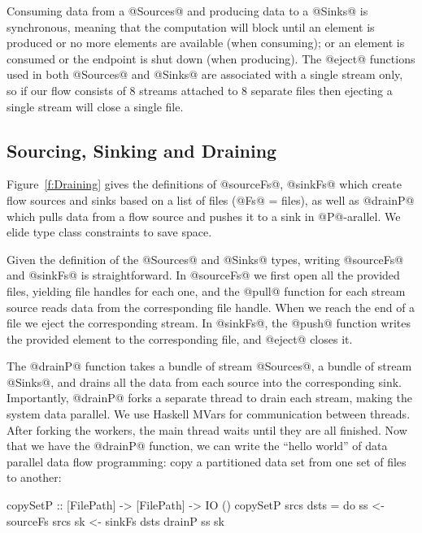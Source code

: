 Consuming data from a @Sources@ and producing data to a @Sinks@ is synchronous, meaning that the computation will block until an element is produced or no more elements are available (when consuming); or an element is consumed or the endpoint is shut down (when producing). The @eject@ functions used in both @Sources@ and @Sinks@ are associated with a single stream only, so if our flow consists of 8 streams attached to 8 separate files then ejecting a single stream will close a single file.


\subsection{Sourcing, Sinking and Draining}
Figure~\ref{f:Draining} gives the definitions of @sourceFs@, @sinkFs@ which create flow sources and sinks based on a list of files (@Fs@ = files), as well as @drainP@ which pulls data from a flow source and pushes it to a sink in @P@-arallel. We elide type class constraints to save space.

Given the definition of the @Sources@ and @Sinks@ types, writing @sourceFs@ and @sinkFs@ is straightforward. In @sourceFs@ we first open all the provided files, yielding file handles for each one, and the @pull@ function for each stream source reads data from the corresponding file handle. When we reach the end of a file we eject the corresponding stream. In @sinkFs@, the @push@ function writes the provided element to the corresponding file, and @eject@ closes it.

The @drainP@ function takes a bundle of stream @Sources@, a bundle of stream @Sinks@, and drains all the data from each source into the corresponding sink. Importantly, @drainP@ forks a separate thread to drain each stream, making the system data parallel. We use Haskell MVars for communication between threads. After forking the workers, the main thread waits until they are all finished. Now that we have the @drainP@ function, we can write the ``hello world'' of data parallel data flow programming: copy a partitioned data set from one set of files to another:
\begin{code}
 copySetP :: [FilePath] -> [FilePath] -> IO ()
 copySetP srcs dsts
  = do  ss <- sourceFs srcs
        sk <- sinkFs   dsts
        drainP ss sk
\end{code}

